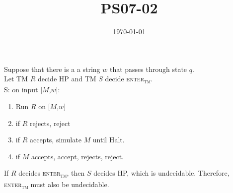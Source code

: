 \documentclass{article}
\title{PS07-02}
\date{\today}
\begin{document}
\maketitle
Suppose that there is a a string $w$ that passes through state $q$.\\
Let TM $R$ decide HP and TM $S$ decide \textsc{enter\textsubscript{tm}}.\\
S: on input [$M$,$w$]:\\
\begin{enumerate}
	\item Run $R$ on [$M$,$w$]
	\item if $R$ rejects, reject
	\item if $R$ accepts, simulate $M$ until Halt.
	\item if $M$ accepts, accept, rejects, reject.
\end{enumerate}
If $R$ decides \textsc{enter\textsubscript{tm}}, then $S$ decides HP, which is undecidable. Therefore, \textsc{enter\textsubscript{tm}} must also be undecidable.
\end{document}
